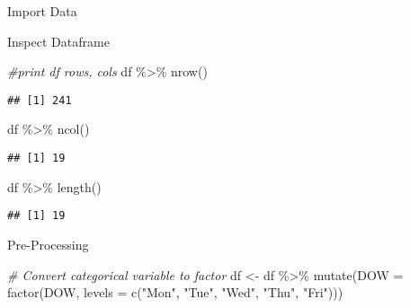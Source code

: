 \documentclass[
  ignorenonframetext,
]{beamer}
\newenvironment{Shaded}{\begin{snugshade}}{\end{snugshade}}
\newcommand{\AttributeTok}[1]{\textcolor[rgb]{0.77,0.63,0.00}{#1}}
\newcommand{\CommentTok}[1]{\textcolor[rgb]{0.56,0.35,0.01}{\textit{#1}}}
\newcommand{\FunctionTok}[1]{\textcolor[rgb]{0.00,0.00,0.00}{#1}}
\newcommand{\NormalTok}[1]{#1}
\newcommand{\OtherTok}[1]{\textcolor[rgb]{0.56,0.35,0.01}{#1}}
\newcommand{\SpecialCharTok}[1]{\textcolor[rgb]{0.00,0.00,0.00}{#1}}
\newcommand{\StringTok}[1]{\textcolor[rgb]{0.31,0.60,0.02}{#1}}
\begin{document}
\begin{frame}[fragile]{Import Data}
\begin{block}{Inspect Dataframe}
\begin{Shaded}
\begin{Highlighting}[]
\CommentTok{\#print df rows, cols}
\NormalTok{df }\SpecialCharTok{\%\textgreater{}\%} 
  \FunctionTok{nrow}\NormalTok{()}
\end{Highlighting}
\end{Shaded}

\begin{verbatim}
## [1] 241
\end{verbatim}

\begin{Shaded}
\begin{Highlighting}[]
\NormalTok{df }\SpecialCharTok{\%\textgreater{}\%} 
  \FunctionTok{ncol}\NormalTok{()}
\end{Highlighting}
\end{Shaded}

\begin{verbatim}
## [1] 19
\end{verbatim}

\begin{Shaded}
\begin{Highlighting}[]
\NormalTok{df }\SpecialCharTok{\%\textgreater{}\%} 
  \FunctionTok{length}\NormalTok{()}
\end{Highlighting}
\end{Shaded}

\begin{verbatim}
## [1] 19
\end{verbatim}
\end{block}

\begin{block}{Pre-Processing}
\protect\hypertarget{pre-processing}{}
\begin{Shaded}
\begin{Highlighting}[]
\CommentTok{\# Convert categorical variable to factor}
\NormalTok{df }\OtherTok{\textless{}{-}}\NormalTok{ df }\SpecialCharTok{\%\textgreater{}\%} 
  \FunctionTok{mutate}\NormalTok{(}\AttributeTok{DOW =} \FunctionTok{factor}\NormalTok{(DOW, }\AttributeTok{levels =} \FunctionTok{c}\NormalTok{(}\StringTok{"Mon"}\NormalTok{, }\StringTok{"Tue"}\NormalTok{, }\StringTok{"Wed"}\NormalTok{, }\StringTok{"Thu"}\NormalTok{, }\StringTok{"Fri"}\NormalTok{)))}
\end{Highlighting}
\end{Shaded}
\end{block}
\end{frame}
\end{document}
